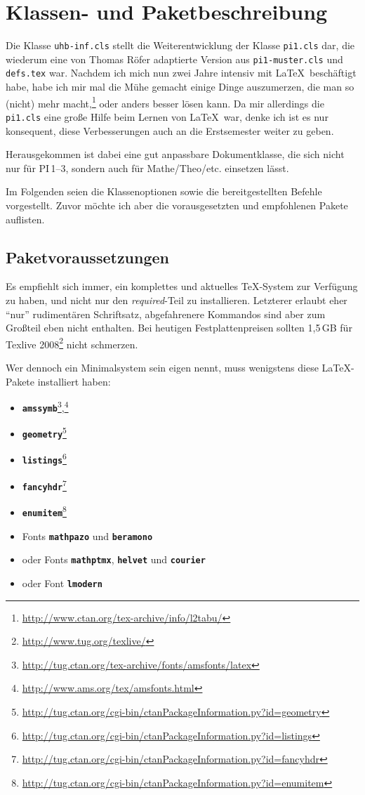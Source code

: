 \documentclass[palatino,gruppe-aus,semester-aus,veranstaltung-aus,abgabe-aus,tutor-aus,utf]{uhb-inf}
\def\option#1{\texttt{\bfseries #1}}
\begin{document}
\section{Klassen- und Paketbeschreibung}

Die Klasse \texttt{uhb-inf.cls} stellt die Weiterentwicklung der Klasse \texttt{pi1.cls} dar, die wiederum eine von Thomas Röfer adaptierte Version aus \texttt{pi1-muster.cls} und \texttt{defs.tex} war. Nachdem ich mich nun zwei Jahre intensiv mit \LaTeX\ beschäftigt habe, habe ich mir mal die Mühe gemacht einige Dinge auszumerzen, die man so (nicht) mehr macht,\footnote{\url{http://www.ctan.org/tex-archive/info/l2tabu/}} oder anders besser lösen kann. Da mir allerdings die \texttt{pi1.cls} eine große Hilfe beim Lernen von \LaTeX\ war, denke ich ist es nur konsequent, diese Verbesserungen auch an die Erstsemester weiter zu geben.

Herausgekommen ist dabei eine gut anpassbare Dokumentklasse, die sich nicht nur für PI\,1--3, sondern auch für Mathe/Theo/etc. einsetzen lässt.

Im Folgenden seien die Klassenoptionen sowie die bereitgestellten Befehle vorgestellt. Zuvor möchte ich aber die vorausgesetzten und empfohlenen Pakete auflisten.

\subsection{Paketvoraussetzungen}

Es empfiehlt sich immer, ein komplettes und aktuelles \TeX-System zur Verfügung zu haben, und nicht nur den \textit{required}-Teil zu installieren. Letzterer erlaubt eher "`nur"' rudimentären Schriftsatz, abgefahrenere Kommandos sind aber zum Großteil eben nicht enthalten. Bei heutigen Festplattenpreisen sollten 1,5\,GB für Texlive 2008\footnote{\url{http://www.tug.org/texlive/}} nicht schmerzen.

Wer dennoch ein Minimalsystem sein eigen nennt, muss wenigstens diese \LaTeX-Pakete installiert haben:

\begin{itemize}[noitemsep]
	\item \option{amssymb}\footnote{\url{http://tug.ctan.org/tex-archive/fonts/amsfonts/latex}},\footnote{\url{http://www.ams.org/tex/amsfonts.html}}
	\item \option{geometry}\footnote{\url{http://tug.ctan.org/cgi-bin/ctanPackageInformation.py?id=geometry}}
	\item \option{listings}\footnote{\url{http://tug.ctan.org/cgi-bin/ctanPackageInformation.py?id=listings}}
	\item \option{fancyhdr}\footnote{\url{http://tug.ctan.org/cgi-bin/ctanPackageInformation.py?id=fancyhdr}}
	\item \option{enumitem}\footnote{\url{http://tug.ctan.org/cgi-bin/ctanPackageInformation.py?id=enumitem}}
	\item Fonts \option{mathpazo} und \option{beramono}
	\item oder Fonts \option{mathptmx}, \option{helvet} und \option{courier}
	\item oder Font \option{lmodern}
\end{itemize}
\end{document}
